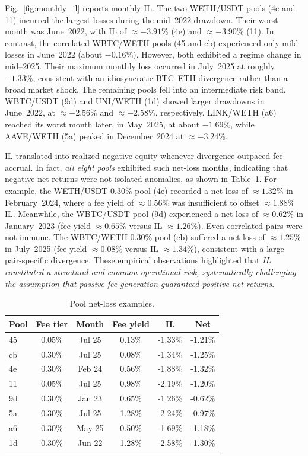 \documentclass[journal]{IEEEtran}
\begin{document}
Fig.~\ref{fig:monthly_il} reports monthly IL. 
The two WETH/USDT pools (4e and 11) incurred the largest losses during the mid--2022 drawdown. 
Their worst month was June~2022, with IL of $\approx-3.91\%$ (4e) and $\approx-3.90\%$ (11).
In contrast, the correlated WBTC/WETH pools (45 and cb) experienced only mild losses in June~2022 (about $-0.16\%$). 
However, both exhibited a regime change in mid--2025. 
Their maximum monthly loss occurred in July~2025 at roughly $-1.33\%$, consistent with an idiosyncratic BTC--ETH divergence rather than a broad market shock.
The remaining pools fell into an intermediate risk band. 
WBTC/USDT (9d) and UNI/WETH (1d) showed larger drawdowns in June~2022, at $\approx-2.56\%$ and $\approx-2.58\%$, respectively. 
LINK/WETH (a6) reached its worst month later, in May~2025, at about $-1.69\%$, while AAVE/WETH (5a) peaked in December~2024 at $\approx-3.24\%$.


IL translated into realized negative equity whenever divergence outpaced fee accrual. In fact, \emph{all eight pools} exhibited such net-loss months, indicating that negative net returns were not isolated anomalies, as shown in Table~\ref{tab:worst_net_loss}. For example, the WETH/USDT 0.30\% pool (4e) recorded a net loss of $\approx1.32\%$ in February~2024, where a fee yield of $\approx0.56\%$ was insufficient to offset $\approx1.88\%$ IL. 
Meanwhile, the WBTC/USDT pool (9d) experienced a net loss of $\approx0.62\%$ in January~2023 (fee yield $\approx0.65\%$ versus IL $\approx1.26\%$). Even correlated pairs were not immune. The WBTC/WETH 0.30\% pool (cb) suffered a net loss of $\approx1.25\%$ in July~2025 (fee yield $\approx0.08\%$ versus IL $\approx1.34\%$), consistent with a large pair-specific divergence.
These empirical observations highlighted that \textit{IL constituted a structural and common operational risk, systematically challenging the assumption that passive fee generation guaranteed positive net returns}.


\begin{table}[b]
\centering
\footnotesize
\begin{tabular}{lccccc}
\toprule
Pool & Fee tier & Month & Fee yield & IL & Net \\
\midrule
45 & 0.05\% & Jul 25 & 0.13\% & -1.33\% & -1.21\% \\
cb & 0.30\% & Jul 25 & 0.08\% & -1.34\% & -1.25\% \\
4e & 0.30\% & Feb 24 & 0.56\% & -1.88\% & -1.32\% \\
11 & 0.05\% & Jul 25 & 0.98\% & -2.19\% & -1.20\% \\
9d & 0.30\% & Jan 23 & 0.65\% & -1.26\% & -0.62\% \\
5a & 0.30\% & Jul 25 & 1.28\% & -2.24\% & -0.97\% \\
a6 & 0.30\% & May 25 & 0.50\% & -1.69\% & -1.18\% \\
1d & 0.30\% & Jun 22 & 1.28\% & -2.58\% & -1.30\% \\
\bottomrule
\end{tabular}
\caption{Pool net-loss examples.}
\label{tab:worst_net_loss}
\end{table}
\end{document}
